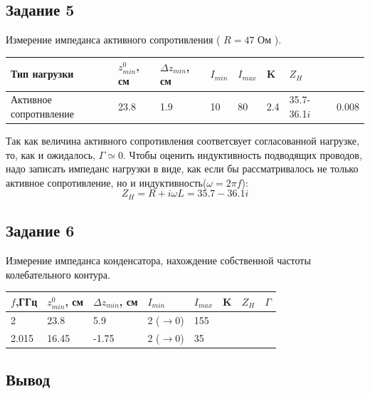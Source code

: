 \subsection{Задание 5}
Измерение импеданса активного сопротивления ( $ R = 47 $ Ом ).

\begin{table}[H]
    \centering
    \begin{tabular}{l|l|l|l|l|l|l|l}
       Тип нагрузки  & $z^0_{min}$, см & $\Delta z_{min}$, см & $I_{min}$ & $I_{max}$ & K &  $Z_H$ &  \\ \hline
    Активное сопротивление &   23.8   &   1.9    &   10  &   80   &  2.4 & 35.7-36.1$i$ & 0.008 \\ 
    \end{tabular}
\end{table}

Так как величина активного сопротивления соответсвует согласованной нагрузке, то, как и ожидалось, $\Gamma \simeq 0.$
Чтобы оценить индуктивность подводящих проводов, надо записать импеданс нагрузки в виде, как если бы рассматривалось не только
активное сопротивление, но и индуктивность($ \omega = 2 \pi f $):
\begin{equation}
    Z_H = R + i\omega L =  35.7-36.1i
\end{equation}

\subsection{Задание 6}
Измерение импеданса конденсатора, нахождение собственной частоты колебательного контура.

\begin{table}[H]
    \centering
    \begin{tabular}{l|l|l|l|l|l|l|l}
       $f$,ГГц  & $z^0_{min}$, см & $\Delta z_{min}$, см & $I_{min}$ & $I_{max}$ & K &  $Z_H$ & $\Gamma$  \\ \hline
    2 &   23.8   &   5.9    &   2 ($\rightarrow 0$)  &   155   &   &  &  \\ \hline
    2.015 &   16.45   &   -1.75    &   2 ($\rightarrow 0$)   &   35   &     &   & 
    \end{tabular}
\end{table}

\subsection{Вывод}




